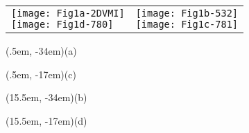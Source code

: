 \documentclass[varwidth=41em]{standalone}
\begin{document}
\begin{tabular}[c]{p{15em}p{50em}}
\shortstack[c]{
 \texttt{[image: Fig1a-2DVMI]} \\[2cm]
\texttt{[image: Fig1d-780]} \\[1.5cm]}
& 
\shortstack[c]{
\texttt{[image: Fig1b-532]}\\
\texttt{[image: Fig1c-781]}}
\end{tabular}
\begin{textblock*}{5em}(.5em, -34em)\sf (a)\end{textblock*}
\begin{textblock*}{5em}(.5em, -17em)\sf (c)\end{textblock*}
\begin{textblock*}{5em}(15.5em, -34em)\sf (b)\end{textblock*}
\begin{textblock*}{5em}(15.5em, -17em)\sf (d)\end{textblock*}
\end{document}
